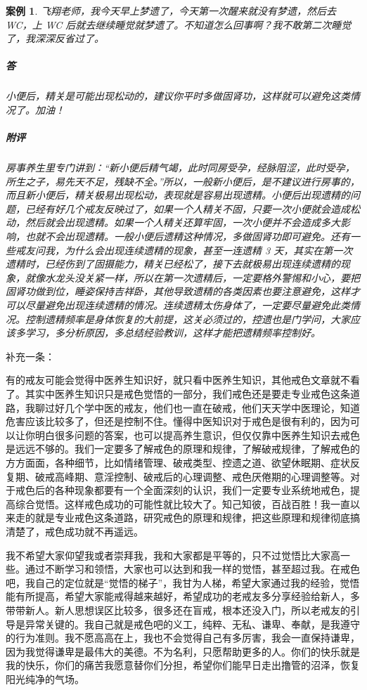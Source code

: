 \documentclass{ctexart}
\newtheorem{case}{案例}
\begin{document}
\begin{case}
    飞翔老师，我今天早上梦遗了，今天第一次醒来就没有梦遗，然后去 WC，上 WC 后就去继续睡觉就梦遗了。不知道怎么回事啊？我不敢第二次睡觉了，我深深反省过了。
    \subparagraph{答} 小便后，精关是可能出现松动的，建议你平时多做固肾功，这样就可以避免这类情况了。加油！
    \subparagraph{附评} 房事养生里专门讲到：“新小便后精气竭，此时同房受孕，经脉阻涩，此时受孕，所生之子，易先天不足，残缺不全。”所以，一般新小便后，是不建议进行房事的，而且新小便后，精关极易出现松动，表现就是容易出现遗精。小便后出现遗精的问题，已经有好几个戒友反映过了，如果一个人精关不固，只要一次小便就会造成松动，然后就会出现遗精。如果一个人精关还算牢固，一次小便并不会造成多大影响，也就不会出现遗精。一般小便后遗精这种情况，多做固肾功即可避免。还有一些戒友问我，为什么会出现连续遗精的现象，甚至一连遗精 3 天，其实在第一次遗精时，已经伤到了固摄能力，精关已经松了，接下去就极易出现连续遗精的现象，就像水龙头没关紧一样，所以在第一次遗精后，一定要格外警惕和小心，要把固肾功做到位，睡姿保持吉祥卧，其他导致遗精的各类因素也要注意避免，这样才可以尽量避免出现连续遗精的情况。连续遗精太伤身体了，一定要尽量避免此类情况。控制遗精频率是身体恢复的大前提，这关必须过的，控遗也是门学问，大家应该多学习，多分析原因，多总结经验教训，这样才能把遗精频率控制好。
\end{case}

补充一条：

有的戒友可能会觉得中医养生知识好，就只看中医养生知识，其他戒色文章就不看了。其实中医养生知识只是戒色觉悟的一部分，我们戒色还是要走专业戒色这条道路，我聊过好几个学中医的戒友，他们也一直在破戒，他们天天学中医理论，知道危害应该比较多了，但还是控制不住。懂得中医知识对于戒色是很有利的，因为可以让你明白很多问题的答案，也可以提高养生意识，但仅仅靠中医养生知识去戒色是远远不够的。我们一定要多了解戒色的原理和规律，了解破戒规律，了解戒色的方方面面，各种细节，比如情绪管理、破戒类型、控遗之道、欲望休眠期、症状反复期、破戒高峰期、意淫控制、破戒后的心理调整、戒色厌倦期的心理调整等。对于戒色后的各种现象都要有一个全面深刻的认识，我们一定要专业系统地戒色，提高综合觉悟。这样戒色成功的可能性就比较大了。知己知彼，百战百胜！我一直以来走的就是专业戒色这条道路，研究戒色的原理和规律，把这些原理和规律彻底搞清楚了，戒色成功就不再遥远。

我不希望大家仰望我或者崇拜我，我和大家都是平等的，只不过觉悟比大家高一些。通过不断学习和领悟，大家也可以达到和我一样的觉悟，甚至超过我。在戒色吧，我自己的定位就是“觉悟的梯子”，我甘为人梯，希望大家通过我的经验，觉悟能有所提高，希望大家能戒得越来越好，希望成功的老戒友多分享经验给新人，多带带新人。新人思想误区比较多，很多还在盲戒，根本还没入门，所以老戒友的引导是异常关键的。我自己就是戒色吧的义工，纯粹、无私、谦卑、奉献，是我遵守的行为准则。我不愿高高在上，我也不会觉得自己有多厉害，我会一直保持谦卑，因为我觉得谦卑是最伟大的美德。不为名利，只愿帮助更多的人。你们的快乐就是我的快乐，你们的痛苦我愿意替你们分担，希望你们能早日走出撸管的沼泽，恢复阳光纯净的气场。
\end{document}
